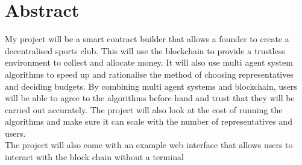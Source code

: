 \chapter{Abstract} \label{Chapter: Abstract}
My project will be a smart contract builder that allows a founder to create a decentralised sports club. This will use the blockchain to provide a trustless environment to collect and allocate money.  It will also use multi agent system algorithms to speed up and rationalise the method of choosing representatives and deciding budgets. By combining multi agent systems and blockchain, users will be able to agree to the algorithms before hand and trust that they will be carried out accurately. The project will also look at the cost of running the algorithms and make sure it can scale with the number of representatives and users. 
\\
The project will also come with an example web interface that allows users to interact with the block chain without a terminal
